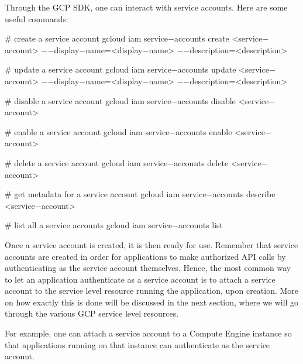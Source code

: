 Through the GCP SDK, one can interact with service accounts. Here are some useful commands:
\begin{bash}
# create a service account
gcloud iam service$-$accounts create <service$-$account> $-$$-$display$-$name=<display$-$name> $-$$-$description=<description>
\end{bash}

\begin{bash}
# update a service account
gcloud iam service$-$accounts update <service$-$account> $-$$-$display$-$name=<display$-$name> $-$$-$description=<description>
\end{bash}

\begin{bash}
# disable a service account
gcloud iam service$-$accounts disable <service$-$account>
\end{bash}

\begin{bash}
# enable a service account
gcloud iam service$-$accounts enable <service$-$account>
\end{bash}

\begin{bash}
# delete a service account
gcloud iam service$-$accounts delete <service$-$account>
\end{bash}

\begin{bash}
# get metadata for a service account
gcloud iam service$-$accounts describe <service$-$account>
\end{bash}

\begin{bash}
# list all a service accounts
gcloud iam service$-$accounts list
\end{bash}

Once a service account is created, it is then ready for use. Remember that service accounts are created in order for
applications to make authorized API calls by authenticating as the service account themselves. Hence, the most common
way to let an application authenticate as a service account is to attach a service account to the service level resource
running the application, upon creation. More on how exactly this is done will be discussed in the next section, where
we will go through the various GCP service level resources.

\be
For example, one can attach a service account to a Compute Engine instance so that applications running on that instance
can authenticate as the service account.
\ee

